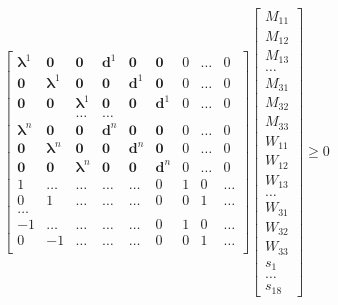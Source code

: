 \documentclass{article}
\renewcommand{\vec}[1]{\boldsymbol{#1}}
\begin{document}
\[
    \begin{bmatrix}
        \vec{\lambda} ^1 & \vec{0} & \vec{0} & \vec{d}^1 & \vec{0} & \vec{0} & 0 & \dots & 0 \\
        \vec{0} & \vec{\lambda} ^1 & \vec{0} & \vec{0} & \vec{d}^1 & \vec{0} & 0 & \dots & 0\\
        \vec{0} & \vec{0} & \vec{\lambda} ^1 & \vec{0} & \vec{0} & \vec{d}^1 & 0 & \dots & 0\\
                & & \dots & \dots & & \\
        \vec{\lambda} ^n & \vec{0} & \vec{0} & \vec{d}^n & \vec{0} & \vec{0} & 0 & \dots & 0\\
        \vec{0} & \vec{\lambda} ^n & \vec{0} & \vec{0} & \vec{d}^n & \vec{0} & 0 & \dots & 0\\
        \vec{0} & \vec{0} & \vec{\lambda} ^n & \vec{0} & \vec{0} & \vec{d}^n & 0 & \dots & 0\\
        1 & \dots & \dots & \dots & \dots & 0 & 1 & 0 & \dots \\
        0 & 1 & \dots & \dots & \dots & 0 & 0 & 1 & \dots \\
        \dots \\
        -1 & \dots & \dots & \dots & \dots & 0 & 1 & 0 & \dots \\
        0 & -1 & \dots & \dots & \dots & 0 & 0 & 1 & \dots \\

    \end{bmatrix}
    \begin{bmatrix}
        M_{11} \\
        M_{12} \\
        M_{13} \\
        \dots \\
        M_{31} \\
        M_{32} \\
        M_{33} \\
        W_{11} \\
        W_{12} \\
        W_{13} \\
        \dots \\
        W_{31} \\
        W_{32} \\
        W_{33} \\
        s_1 \\
        \dots \\
        s_{18}
    \end{bmatrix}
    \geq 0
\]
\end{document}
